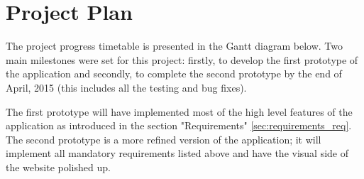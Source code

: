 \section{Project Plan}
\label{projectplan_req}
The project progress timetable is presented in the Gantt diagram below. Two main milestones were set for this project: firstly, to develop the first prototype of the application and secondly, to complete the second prototype by the end of April, 2015 (this includes all the testing and bug fixes). 

The first prototype will have implemented most of the high level features of the application as introduced in the section "Requirements" \ref{sec:requirements_req}. The second prototype is a more refined version of the application; it will implement all mandatory requirements listed above and have the visual side of the website polished up. 

